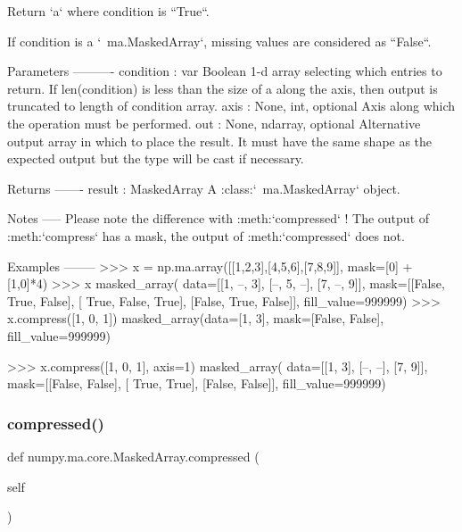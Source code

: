 \begin{DoxyVerb}Return `a` where condition is ``True``.

If condition is a `~ma.MaskedArray`, missing values are considered
as ``False``.

Parameters
----------
condition : var
    Boolean 1-d array selecting which entries to return. If len(condition)
    is less than the size of a along the axis, then output is truncated
    to length of condition array.
axis : {None, int}, optional
    Axis along which the operation must be performed.
out : {None, ndarray}, optional
    Alternative output array in which to place the result. It must have
    the same shape as the expected output but the type will be cast if
    necessary.

Returns
-------
result : MaskedArray
    A :class:`~ma.MaskedArray` object.

Notes
-----
Please note the difference with :meth:`compressed` !
The output of :meth:`compress` has a mask, the output of
:meth:`compressed` does not.

Examples
--------
>>> x = np.ma.array([[1,2,3],[4,5,6],[7,8,9]], mask=[0] + [1,0]*4)
>>> x
masked_array(
  data=[[1, --, 3],
[--, 5, --],
[7, --, 9]],
  mask=[[False,  True, False],
[ True, False,  True],
[False,  True, False]],
  fill_value=999999)
>>> x.compress([1, 0, 1])
masked_array(data=[1, 3],
     mask=[False, False],
       fill_value=999999)

>>> x.compress([1, 0, 1], axis=1)
masked_array(
  data=[[1, 3],
[--, --],
[7, 9]],
  mask=[[False, False],
[ True,  True],
[False, False]],
  fill_value=999999)\end{DoxyVerb}
 \mbox{\label{classnumpy_1_1ma_1_1core_1_1MaskedArray_acef5d8be7f992cbcb451deaeaf3408a7}} 
\subsubsection{\texorpdfstring{compressed()}{compressed()}}
{\footnotesize\ttfamily def numpy.\+ma.\+core.\+Masked\+Array.\+compressed (\begin{DoxyParamCaption}\item[{}]{self }\end{DoxyParamCaption})}

